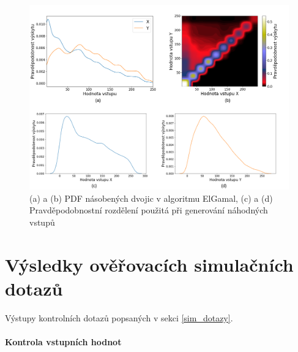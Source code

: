 \begin{figure}[H]
    \centering
    \includegraphics[width=\textwidth]{obrazky-figures/triang_weibull_all.png}
    \caption{(a) a (b) PDF násobených dvojic v algoritmu ElGamal, (c) a (d) Pravděpodobnostní rozdělení použitá při generování náhodných vstupů}
    \label{fig:triang_weibull}
\end{figure}

\chapter{Výsledky ověřovacích simulačních dotazů} \label{append:control_sims}
Výstupy kontrolních dotazů popsaných v sekci \ref{sim_dotazy}.

\subsubsection{Kontrola vstupních hodnot}

